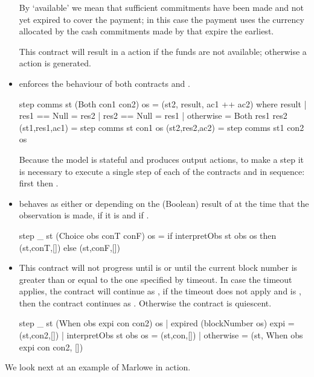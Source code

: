 \documentclass[runningheads]{llncs}
\begin{document}
\begin{itemize}
By `available' we mean that sufficient commitments have 
been made and  not yet expired to cover the payment; in this case the payment  uses the currency allocated by the cash 
commitments made by  that expire the earliest.

This contract will result in a  action if the funds are not available; otherwise a 
 action is generated.

\item {} enforces the behaviour of both contracts  and . 

\smallskip
\begin{haskellcode}
step comms st (Both con1 con2) os =
    (st2, result, ac1 ++ ac2)
    where
        result | res1 == Null = res2
               | res2 == Null = res1
               | otherwise = Both res1 res2
        (st1,res1,ac1) = step comms st con1 os
        (st2,res2,ac2) = step comms st1 con2 os
\end{haskellcode}
\smallskip

Because the model is stateful and produces output actions, to make a step it is necessary to execute a single step of 
each of  the contracts  and  in sequence: first  then 
.

\item {} behaves as either  or  depending on the 
(Boolean) result of  at the time that the observation is made,  if it is 
 and  if .

\smallskip
\begin{haskellcode}
step _ st (Choice obs conT conF) os =
    if interpretObs st obs os
        then (st,conT,[])
        else (st,conF,[])
\end{haskellcode}
\smallskip

\item {} This contract will not progress until  is 
 or until the current block number is greater than or equal to the one specified by timeout. In case 
the timeout applies, the contract will continue as , if the timeout does not apply and 
 is , then the contract continues as . Otherwise the contract is 
quiescent.

\smallskip
\begin{haskellcode}
step _ st (When obs expi con con2) os
  | expired (blockNumber os) expi = (st,con2,[])
  | interpretObs st obs os = (st,con,[])
  | otherwise = (st, When obs expi con con2, [])
  \end{haskellcode}
\smallskip

\end{itemize}
We look next at an example of Marlowe in action.
\end{document}
